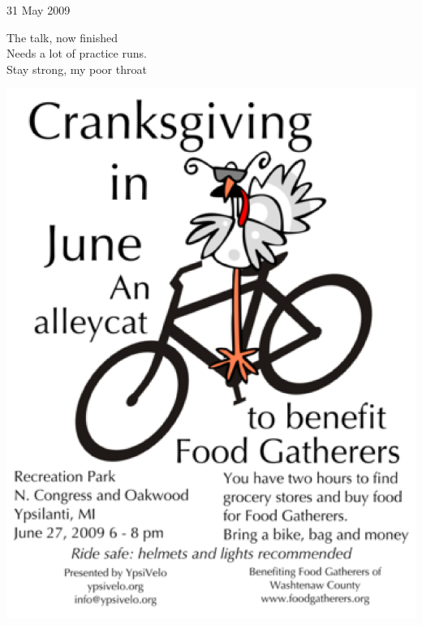 \documentclass[12pt]{article}
\begin{document}
31 May 2009

The talk, now finished \\
Needs a lot of practice runs. \\
Stay strong, my poor throat

\newpage

\includegraphics{back.png}

\newpage
\end{document}
